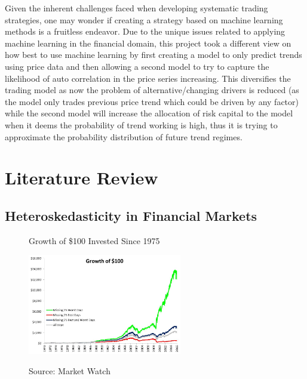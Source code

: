 \documentclass[11pt]{article}
\begin{document}
Given the inherent challenges faced when developing systematic trading strategies, one may wonder if creating a strategy based on machine learning methods is a fruitless endeavor.
\newline Due to the unique issues related to applying machine learning in the financial domain, this project took a different view on how best to use machine learning by first creating a model to only predict trends using price data and then allowing a second model to try to capture the likelihood of auto correlation in the price series increasing. This diversifies the trading model as now the problem of alternative/changing drivers is reduced (as the model only trades previous price trend which could be driven by any factor) while the second model will increase the allocation of risk capital to the model when it deems the probability of trend working is high, thus it is trying to approximate the probability distribution of future trend regimes.


\section{Literature Review}


\subsection{Heteroskedasticity in Financial Markets}

\begin{figure}[h]
    \centering
	\caption{Growth of \$100 Invested Since 1975}
    \includegraphics[width=0.6\textwidth]{beststockdays}    
    \label{fig:beststockdays}
	\caption*{\small Source: Market Watch\cite{bestdays}}
\end{figure}
\end{document}
